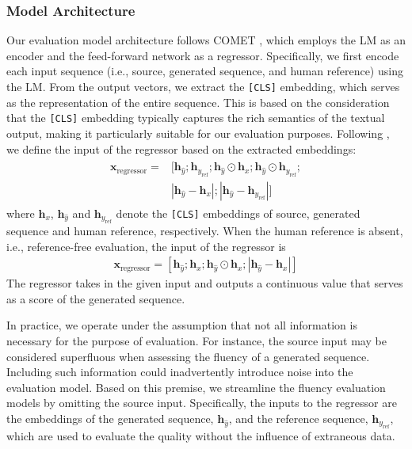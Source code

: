 \documentclass[lettersize,journal]{IEEEtran}
\begin{document}
\subsubsection{Model Architecture}
\label{sec:model-arch}
Our evaluation model architecture follows COMET \cite{rei2020comet}, which employs the LM as an encoder and the feed-forward network as a regressor. Specifically, we first encode each input sequence (i.e., source, generated sequence, and human reference) using the LM. From the output vectors, we extract the \texttt{[CLS]} embedding, which serves as the representation of the entire sequence. This is based on the consideration that the \texttt{[CLS]} embedding typically captures the rich semantics of the textual output, making it particularly suitable for our evaluation purposes. Following \cite{shimanaka2018ruse}, we define the input of the regressor based on the extracted embeddings:
\begin{eqnarray}
		\begin{aligned}
		\bm{x}_{\mathrm{regressor}}=&[\bm{h}_{\hat{y}};\bm{h}_{y_{\mathrm{ref}}};\bm{h}_{\hat{y}}\odot\bm{h}_{x};\bm{h}_{\hat{y}}\odot\bm{h}_{y_{\mathrm{ref}}};\\&|\bm{h}_{\hat{y}}-\bm{h}_{x}|;|\bm{h}_{\hat{y}}-\bm{h}_{y_{\mathrm{ref}}}|]
		\end{aligned}
\end{eqnarray}
where $\bm{h}_{x}$, $\bm{h}_{\hat{y}}$ and $\bm{h}_{y_{\mathrm{ref}}}$ denote the \texttt{[CLS]} embeddings of source, generated sequence and human reference, respectively. 
When the human reference is absent, i.e., reference-free evaluation, the input of the regressor is
\begin{eqnarray}
		\bm{x}_{\mathrm{regressor}}=[\bm{h}_{\hat{y}};\bm{h}_{x};\bm{h}_{\hat{y}}\odot\bm{h}_{x};|\bm{h}_{\hat{y}}-\bm{h}_{x}|]
\end{eqnarray}
The regressor takes in the given input and outputs a continuous value that serves as a score of the generated sequence. 

In practice, we operate under the assumption that not all information is necessary for the purpose of evaluation. For instance, the source input may be considered superfluous when assessing the fluency of a generated sequence. Including such information could inadvertently introduce noise into the evaluation model. Based on this premise, we streamline the fluency evaluation models by omitting the source input. Specifically, the inputs to the regressor are the embeddings of the generated sequence, $\bm{h}_{\hat{y}}$, and the reference sequence, $\bm{h}_{y_{\mathrm{ref}}}$, which are used to evaluate the quality without the influence of extraneous data.
\end{document}
